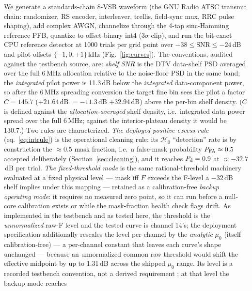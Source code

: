 We generate a standards-chain 8-VSB waveform (the GNU Radio ATSC transmit
chain: randomizer, RS encoder, interleaver, trellis, field-sync mux, RRC
pulse shaping), add complex AWGN, channelize through the 4-tap
sinc-Hamming reference PFB, quantize to offset-binary int4 ($3\sigma$
clip), and run the bit-exact CPU reference detector at 1000 trials per
grid point over $-38 \le \mathrm{SNR} \le -24$\,dB and pilot offsets
$\{-1, 0, +1\}$\,kHz (Fig.~\ref{fig:curves}). The conventions, audited
against the testbench source, are: \emph{shelf SNR} is the DTV data-shelf
PSD averaged over the full 6\,MHz allocation relative to the noise-floor
PSD in the same band; the \emph{integrated} pilot power is 11.3\,dB below
the \emph{integrated} data-component power, so after the 6\,MHz spreading
conversion the target fine bin sees the pilot a factor $C = 145.7$
($+21.64$\,dB $= -11.3$\,dB $+ 32.94$\,dB) above the per-bin shelf
density. ($C$ is defined against the \emph{allocation-averaged} shelf
density, i.e.\ integrated data power spread over the full 6\,MHz;
against the interior-plateau density it would be 130.7.)
Two rules are characterized. \emph{The deployed positive-excess rule}
(eq.~\ref{eq:intrule}) is the operational cleaning rule: its
$\mathcal{H}_0$ ``detection'' rate is by construction the $\approx 0.5$
mask fraction, i.e.\ a false-mask probability $P_{\rm FA} \approx 0.5$
accepted deliberately (Section~\ref{sec:cleaning}), and it reaches
$P_{\rm d} = 0.9$ at $\approx\mathbf{-32.7}$\,dB per trial.
\emph{The fixed-threshold mode} is the same rational-threshold machinery
evaluated at a fixed physical level --- mask iff $F$ exceeds the F-level
a $-32$\,dB shelf implies under this mapping --- retained as a
calibration-free \emph{backup operating mode}: it requires no measured
zero point, so it can run before a null-core calibration exists or while
the mask-fraction health check flags drift. As implemented in the
testbench and as tested here, the threshold is the \emph{unnormalized}
raw-F level and the tested curve is channel 14's; the deployment
specification additionally rescales the level per channel by the
\emph{analytic} $\mu_0$ (itself calibration-free) --- a per-channel
constant that leaves each curve's shape unchanged --- because an
unnormalized common raw threshold would shift the effective midpoint by
up to 1.31\,dB across the shipped $\mu_0$ range. Its level is a recorded
testbench convention, not a derived requirement ; at that level the backup mode reaches
